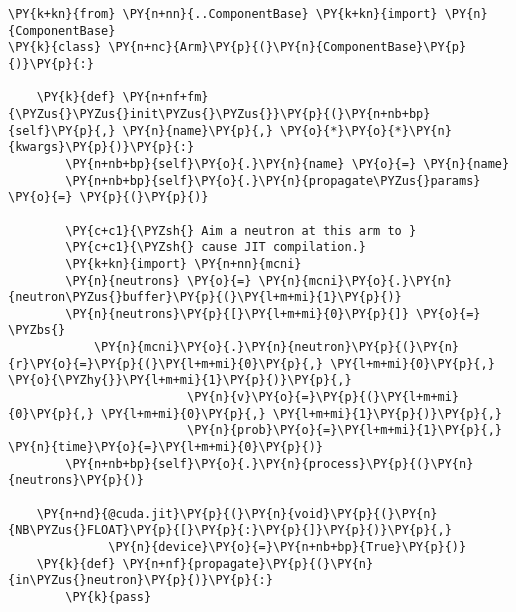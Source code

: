 \begin{Verbatim}[commandchars=\\\{\}]
\PY{k+kn}{from} \PY{n+nn}{..ComponentBase} \PY{k+kn}{import} \PY{n}{ComponentBase}
\PY{k}{class} \PY{n+nc}{Arm}\PY{p}{(}\PY{n}{ComponentBase}\PY{p}{)}\PY{p}{:}

    \PY{k}{def} \PY{n+nf+fm}{\PYZus{}\PYZus{}init\PYZus{}\PYZus{}}\PY{p}{(}\PY{n+nb+bp}{self}\PY{p}{,} \PY{n}{name}\PY{p}{,} \PY{o}{*}\PY{o}{*}\PY{n}{kwargs}\PY{p}{)}\PY{p}{:}
        \PY{n+nb+bp}{self}\PY{o}{.}\PY{n}{name} \PY{o}{=} \PY{n}{name}
        \PY{n+nb+bp}{self}\PY{o}{.}\PY{n}{propagate\PYZus{}params} \PY{o}{=} \PY{p}{(}\PY{p}{)}

        \PY{c+c1}{\PYZsh{} Aim a neutron at this arm to }
        \PY{c+c1}{\PYZsh{} cause JIT compilation.}
        \PY{k+kn}{import} \PY{n+nn}{mcni}
        \PY{n}{neutrons} \PY{o}{=} \PY{n}{mcni}\PY{o}{.}\PY{n}{neutron\PYZus{}buffer}\PY{p}{(}\PY{l+m+mi}{1}\PY{p}{)}
        \PY{n}{neutrons}\PY{p}{[}\PY{l+m+mi}{0}\PY{p}{]} \PY{o}{=} \PYZbs{}
            \PY{n}{mcni}\PY{o}{.}\PY{n}{neutron}\PY{p}{(}\PY{n}{r}\PY{o}{=}\PY{p}{(}\PY{l+m+mi}{0}\PY{p}{,} \PY{l+m+mi}{0}\PY{p}{,} \PY{o}{\PYZhy{}}\PY{l+m+mi}{1}\PY{p}{)}\PY{p}{,} 
                         \PY{n}{v}\PY{o}{=}\PY{p}{(}\PY{l+m+mi}{0}\PY{p}{,} \PY{l+m+mi}{0}\PY{p}{,} \PY{l+m+mi}{1}\PY{p}{)}\PY{p}{,} 
                         \PY{n}{prob}\PY{o}{=}\PY{l+m+mi}{1}\PY{p}{,} \PY{n}{time}\PY{o}{=}\PY{l+m+mi}{0}\PY{p}{)}
        \PY{n+nb+bp}{self}\PY{o}{.}\PY{n}{process}\PY{p}{(}\PY{n}{neutrons}\PY{p}{)}

    \PY{n+nd}{@cuda.jit}\PY{p}{(}\PY{n}{void}\PY{p}{(}\PY{n}{NB\PYZus{}FLOAT}\PY{p}{[}\PY{p}{:}\PY{p}{]}\PY{p}{)}\PY{p}{,} 
              \PY{n}{device}\PY{o}{=}\PY{n+nb+bp}{True}\PY{p}{)}
    \PY{k}{def} \PY{n+nf}{propagate}\PY{p}{(}\PY{n}{in\PYZus{}neutron}\PY{p}{)}\PY{p}{:}
        \PY{k}{pass}
\end{Verbatim}
